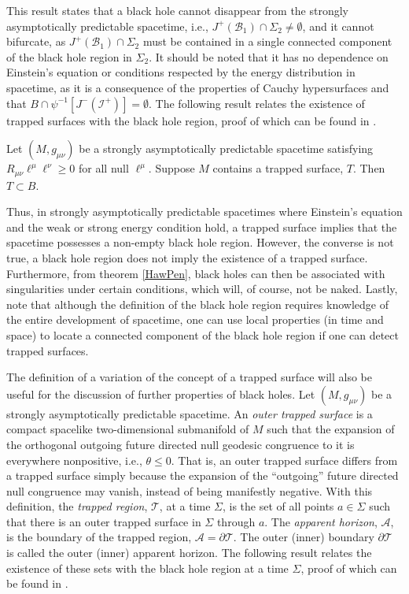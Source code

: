 \documentclass[
12pt,		%
openright,	%
twoside,  %
a4paper,			%
chapter=TITLE,		%
english,			%
french,				%
spanish,			%
brazil				%
]{USPSC-classe/USPSC}
\begin{document}
This result states that a black hole cannot disappear from the strongly asymptotically predictable spacetime, i.e., $J^+(\mathscr{B}_1)\cap \Sigma_2\neq \emptyset$, and it cannot bifurcate, as $J^+(\mathscr{B}_1)\cap \Sigma_2$ must be contained in a single connected component of the black hole region in $\Sigma_2$. It should be noted that it has no dependence on Einstein's equation or conditions respected by the energy distribution in spacetime, as it is a consequence of the properties of Cauchy hypersurfaces and that $B\cap \psi^{-1}[J^-(\mathscr{I}^+)]=\emptyset$. The following result relates the existence of trapped surfaces with the black hole region, proof of which can be found in \cite{Hawking1973}.

\begin{proposition}\label{trapped}
    Let $(M,g_{\mu\nu})$ be a strongly asymptotically predictable spacetime satisfying $R_{\mu\nu}\ell^{\mu}\ell^{\nu}\geq 0$ for all null $\ell^{\mu}$. Suppose $M$ contains a trapped surface, $T$. Then $T\subset B$.
\end{proposition}

Thus, in strongly asymptotically predictable spacetimes where Einstein's equation and the weak or strong energy condition hold, a trapped surface implies that the spacetime possesses a non-empty black hole region. However, the converse is not true, a black hole region does not imply the existence of a trapped surface. Furthermore, from theorem \ref{HawPen}, black holes can then be associated with singularities under certain conditions, which will, of course, not be naked. Lastly, note that although the definition of the black hole region requires knowledge of the entire development of spacetime, one can use local properties (in time and space) to locate a connected component of the black hole region if one can detect trapped surfaces. 

The definition of a variation of the concept of a trapped surface will also be useful for the discussion of further properties of black holes. Let $(M,g_{\mu\nu})$ be a strongly asymptotically predictable spacetime. An \textit{outer trapped surface} is a compact spacelike two-dimensional submanifold of $M$ such that the expansion of the orthogonal outgoing future directed null geodesic congruence to it is everywhere nonpositive, i.e., $\theta\leq0$. That is, an outer trapped surface differs from a trapped surface simply because the expansion of the ``outgoing'' future directed null congruence may vanish, instead of being manifestly negative. With this definition, the \textit{trapped region}, $\mathcal{T}$, at a time $\Sigma$, is the set of all points $a\in\Sigma$ such that there is an outer trapped surface in $\Sigma$ through $a$. The \textit{apparent horizon}, $\mathscr{A}$, is the boundary of the trapped region, $\mathscr{A}=\partial \mathcal{T}$. The outer (inner) boundary $\partial \mathcal{T}$ is called the outer (inner) apparent horizon. The following result relates the existence of these sets with the black hole region at a time $\Sigma$, proof of which can be found in \cite{Hawking1973}. 
\end{document}
